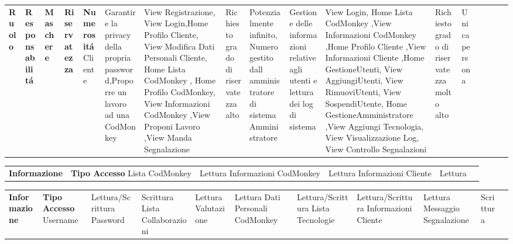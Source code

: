 \begin{center}
    \begin{tabularx}
        {\textwidth} {|X|X|X|X|X|}
         \hline  {}
         \n      {}
         \large \textbf{Ruolo} & \centering\large\textbf{Responsabilitá} & \large\textbf{Maschere} & \centering\large\textbf{Riservatezza} & \centering\large\textbf{Numerositá}
         \n        Cliente                      &          Garantire la privacy della propria password,\newline     Proporre un lavoro ad una CodMonkey                     &                 View Registrazione, View Login,Home Profilo Cliente, View Modifica Dati Personali Cliente, Home Lista CodMonkey , Home Profilo CodMonkey, View Informazioni CodMonkey    ,View Proponi Lavoro ,View Manda Segnalazione      &            Richiesto grado di riservatezza alto                   & Potenzialmente infinito, Numero gestito \newline dall amministratore di sistema
         \n         Amministratore                &          Gestione delle informazioni relative agli utenti e lettura dei log di sistema                         &              View Login, Home Lista CodMonkey ,View Informazioni CodMonkey ,Home Profilo Cliente ,View Informazioni Cliente ,Home GestioneUtenti, View AggiungiUtenti, View RimuoviUtenti, View SospendiUtente, Home GestioneAmministratore ,View Aggiungi Tecnologia, View Visualizzazione Log, View Controllo Segnalazioni      &        Richiesto grado di riservatezza molto alto           &    Unica persona    
          \n
     \end{tabularx}
     \label{tab:monkeytable:problema:tabellaRuoli}

    \begin{tabularx}
       {\textwidth} {|X|X|}
        \hline  {}
        \n      {}
        \large \textbf{Informazione} & \centering\large\textbf{Tipo Accesso}
        \n         Lista CodMonkey                  &  Lettura
        \n         Informazioni CodMonkey                  & Lettura
        \n Informazioni Cliente & Lettura
        \n
    \end{tabularx}
    \label{tab:monkeytable:problema:tabellafmeiageahjnaijgnaij}

    \begin{tabularx}
        {\textwidth} {|X|X|}
         \hline  {}
         \n      {}
         \large \textbf{Informazione} & \centering\large\textbf{Tipo Accesso}
         \n           Username                &    Lettura/Scrittura
        \n               Password            &    Scrittura
        \n     Lista Collaborazioni   & Lettura
        \n     Valutazione   & Lettura
        \n     Dati Personali CodMonkey& Lettura/Scrittura
        \n    Lista Tecnologie     & Lettura/Scrittura
        \n    Informazioni Cliente & Lettura
        \n Messaggio Segnalazione & Scrittura
        

\end{tabularx}
\end{center}
